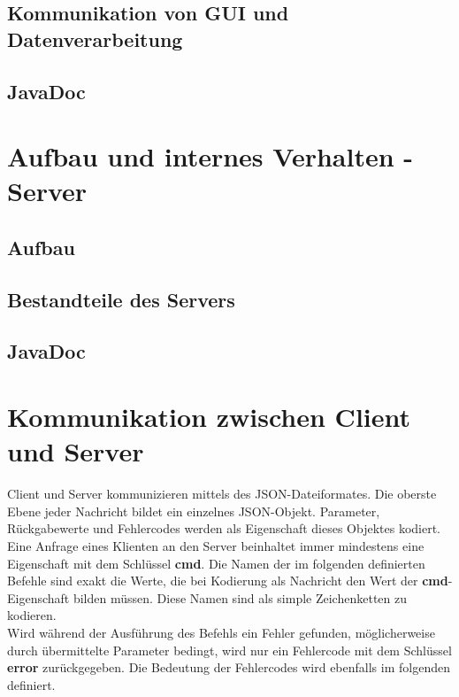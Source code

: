 \documentclass[parskip=full,11pt]{scrartcl}
\begin{document}
\subsection{Kommunikation von GUI und Datenverarbeitung}

\subsection{JavaDoc}

\pagebreak
\section{Aufbau und internes Verhalten - Server}

\subsection{Aufbau}

\subsection{Bestandteile des Servers}

\subsection{JavaDoc}

\pagebreak
\section{Kommunikation zwischen Client und Server}
Client und Server kommunizieren mittels des JSON-Dateiformates.
Die oberste Ebene jeder Nachricht bildet ein einzelnes JSON-Objekt.
Parameter, Rückgabewerte und Fehlercodes werden als Eigenschaft dieses Objektes
kodiert.
Eine Anfrage eines Klienten an den Server beinhaltet immer mindestens eine
Eigenschaft mit dem Schlüssel \textbf{cmd}.
Die Namen der im folgenden definierten Befehle sind exakt die Werte, die bei
Kodierung als Nachricht den Wert der \textbf{cmd}-Eigenschaft bilden müssen.
Diese Namen sind als simple Zeichenketten zu kodieren.
\\Wird während der Ausführung des Befehls ein Fehler gefunden, möglicherweise durch
übermittelte Parameter bedingt, wird nur ein Fehlercode mit dem Schlüssel
\textbf{error} zurückgegeben. Die Bedeutung der Fehlercodes wird ebenfalls im
folgenden definiert.
\end{document}
